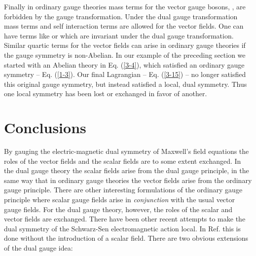 \documentclass[a4paper,aps]{revtex4}
\begin{document}
Finally in ordinary gauge theories mass terms
for the vector gauge bosons, \coordHE{}, are forbidden
by the gauge transformation.
Under the dual gauge transformation mass terms and
self interaction terms are allowed for the vector fields.
One can have terms like \coordHE{} or
\coordHE{} which are invariant under the
dual gauge transformation. Similar quartic terms for the
vector fields can arise in ordinary gauge theories if the
gauge symmetry is non-Abelian. In our example of the preceding
section we started with an Abelian theory in Eq. (\ref{3-4}), which
satisfied an ordinary gauge symmetry -- Eq. (\ref{1-3}). Our final
Lagrangian -- Eq. (\ref{3-15}) -- no longer satisfied this original
gauge symmetry, but instead satisfied a local, dual symmetry. Thus
one local symmetry has been lost or exchanged in favor of another.

\section{Conclusions}

By gauging the electric-magnetic dual
symmetry of Maxwell's field equations the roles of the
vector fields and the scalar fields are to some extent
exchanged. In the dual gauge theory the scalar fields arise
from the dual gauge principle, in the same way that in ordinary
gauge theories the vector fields
arise from the ordinary gauge principle.
There are other interesting formulations of the ordinary
gauge principle \cite{chaves} where scalar gauge fields arise
in {\it conjunction} with the usual vector gauge fields. For the dual
gauge theory, however, the roles of the scalar and vector fields
are exchanged. There have been other recent attempts
\cite{pak} to make the dual symmetry of the Schwarz-Sen electromagnetic
action \cite{sen} local. In Ref. \cite{pak} this is done
without the introduction of a scalar field. There are two
obvious extensions of the dual gauge idea:
\end{document}
